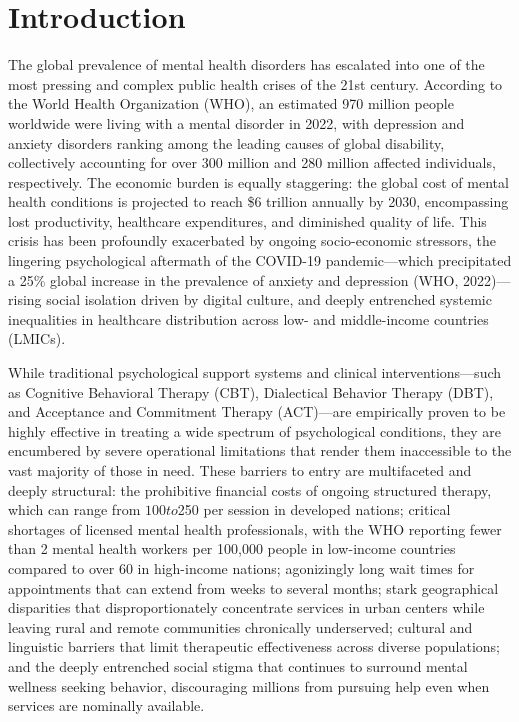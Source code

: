 \documentclass[12pt,twoside]{article}
\begin{document}
\vspace{1.2em}

\section{Introduction}

The global prevalence of mental health disorders has escalated into one of the most pressing and complex public health crises of the 21st century. According to the World Health Organization (WHO), an estimated 970 million people worldwide were living with a mental disorder in 2022, with depression and anxiety disorders ranking among the leading causes of global disability, collectively accounting for over 300 million and 280 million affected individuals, respectively. The economic burden is equally staggering: the global cost of mental health conditions is projected to reach \$6 trillion annually by 2030, encompassing lost productivity, healthcare expenditures, and diminished quality of life. This crisis has been profoundly exacerbated by ongoing socio-economic stressors, the lingering psychological aftermath of the COVID-19 pandemic---which precipitated a 25\% global increase in the prevalence of anxiety and depression (WHO, 2022)---rising social isolation driven by digital culture, and deeply entrenched systemic inequalities in healthcare distribution across low- and middle-income countries (LMICs).

While traditional psychological support systems and clinical interventions---such as Cognitive Behavioral Therapy (CBT), Dialectical Behavior Therapy (DBT), and Acceptance and Commitment Therapy (ACT)---are empirically proven to be highly effective in treating a wide spectrum of psychological conditions, they are encumbered by severe operational limitations that render them inaccessible to the vast majority of those in need. These barriers to entry are multifaceted and deeply structural: the prohibitive financial costs of ongoing structured therapy, which can range from $100 to $250 per session in developed nations; critical shortages of licensed mental health professionals, with the WHO reporting fewer than 2 mental health workers per 100,000 people in low-income countries compared to over 60 in high-income nations; agonizingly long wait times for appointments that can extend from weeks to several months; stark geographical disparities that disproportionately concentrate services in urban centers while leaving rural and remote communities chronically underserved; cultural and linguistic barriers that limit therapeutic effectiveness across diverse populations; and the deeply entrenched social stigma that continues to surround mental wellness seeking behavior, discouraging millions from pursuing help even when services are nominally available.
\end{document}
